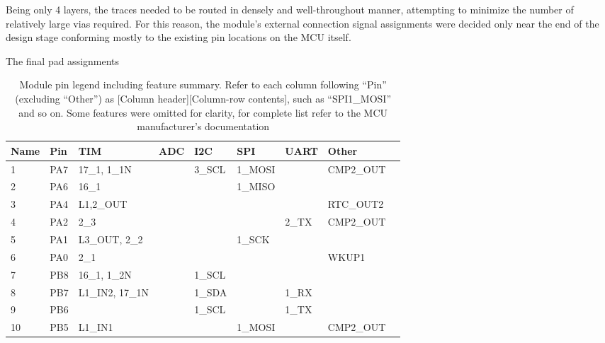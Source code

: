 Being only 4 layers, the traces needed to be routed in densely and well-throughout manner, attempting to minimize the number of relatively large vias required. For this reason, the module's external connection signal assignments were decided only near the end of the design stage conforming mostly to the existing pin locations on the MCU itself.

The final pad assignments

\begin{table}[H]
\begin{center}
\caption{\label{table:module-pin-legend}Module pin legend including feature summary. Refer to each column following ``Pin'' (excluding ``Other'') as [Column header][Column-row contents], such as ``SPI1\_MOSI'' and so on. Some features were omitted for clarity, for complete list refer to the MCU manufacturer's documentation}
    \begin{tabular}{|l|l|l|l|l|l|l|l|l|} \hline
    \textbf{Name} & \textbf{Pin} & \textbf{TIM} & \textbf{ADC} & \textbf{I2C} & \textbf{SPI} & \textbf{UART} & \textbf{Other}\\ \hline
    1        & PA7  & 17\_1, 1\_1N    &     & 3\_SCL & 1\_MOSI &             & CMP2\_OUT          \\ \hline
    2        & PA6  & 16\_1          &     &       & 1\_MISO &             &                    \\ \hline
    3        & PA4  & L1,2\_OUT      &     &       &        &             & RTC\_OUT2           \\ \hline
    4        & PA2  & 2\_3           &     &       &        & 2\_TX & CMP2\_OUT           \\ \hline
    5        & PA1  & L3\_OUT, 2\_2   &     &       & 1\_SCK  &             &                    \\ \hline
    6        & PA0  & 2\_1           &     &       &        &             & WKUP1   \\ \hline
    7        & PB8  & 16\_1, 1\_2N    &     & 1\_SCL &        &             &                    \\ \hline
    8        & PB7  & L1\_IN2, 17\_1N &     & 1\_SDA &        & 1\_RX        &                    \\ \hline
    9        & PB6  &               &     & 1\_SCL &        & 1\_TX        &                    \\ \hline
    10       & PB5  & L1\_IN1        &     &       & 1\_MOSI &             & CMP2\_OUT          \\ \hline

\end{tabular}
\end{center}
\end{table}
